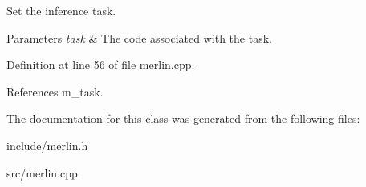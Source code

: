 Set the inference task. 


\begin{DoxyParams}{Parameters}
{\em task} & The code associated with the task. \\
\hline
\end{DoxyParams}


Definition at line 56 of file merlin.\+cpp.



References m\+\_\+task.



The documentation for this class was generated from the following files\+:\begin{DoxyCompactItemize}
\item 
include/merlin.\+h\item 
src/merlin.\+cpp\end{DoxyCompactItemize}
